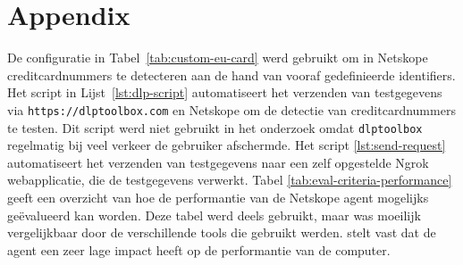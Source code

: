 
\chapter{Appendix}
\label{app:appendix}

De configuratie in Tabel~\ref{tab:custom-eu-card} werd gebruikt om in Netskope creditcardnummers te detecteren aan de hand van vooraf gedefinieerde identifiers.  
Het script in Lijst~\ref{lst:dlp-script} automatiseert het verzenden van testgegevens via \texttt{https://dlptoolbox.com} en Netskope om de detectie van creditcardnummers te testen. 
Dit script werd niet gebruikt in het onderzoek omdat \texttt{dlptoolbox} regelmatig bij veel verkeer de gebruiker afschermde.
Het script \ref{lst:send-request} automatiseert het verzenden van testgegevens naar een zelf opgestelde Ngrok webapplicatie, die de testgegevens verwerkt.
Tabel \ref{tab:eval-criteria-performance} geeft een overzicht van hoe de performantie van de Netskope agent mogelijks geëvalueerd kan worden. 
Deze tabel werd deels gebruikt, maar was moeilijk vergelijkbaar door de verschillende tools die gebruikt werden.
\textcite{Netskope2025Utilization} stelt vast dat de agent een zeer lage impact heeft op de performantie van de computer.


